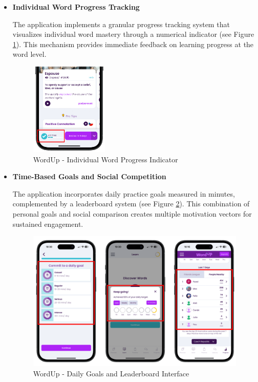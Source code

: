 \begin{itemize}
    \item \textbf{Individual Word Progress Tracking}
    \label{sec:wordup-individual-word-progress-experience}
    
    The application implements a granular progress tracking system that visualizes individual word mastery through a numerical indicator (see Figure \ref{fig:wordup-word-progress}). This mechanism provides immediate feedback on learning progress at the word level.

    \begin{figure}[!h]
        \includegraphics[width=0.35\textwidth]{src/figures/wordup-word-progress.png}
        \caption{WordUp - Individual Word Progress Indicator}
        \label{fig:wordup-word-progress}
    \end{figure}

    \item \textbf{Time-Based Goals and Social Competition}

    The application incorporates daily practice goals measured in minutes, complemented by a leaderboard system (see Figure \ref{fig:wordup-daily-goal}). This combination of personal goals and social comparison creates multiple motivation vectors for sustained engagement.

    \begin{figure}[!h]
        \includegraphics[width=0.99\textwidth]{src/figures/wordup-daily-goal.png}
        \caption{WordUp - Daily Goals and Leaderboard Interface}
        \label{fig:wordup-daily-goal}
    \end{figure}

\end{itemize}

